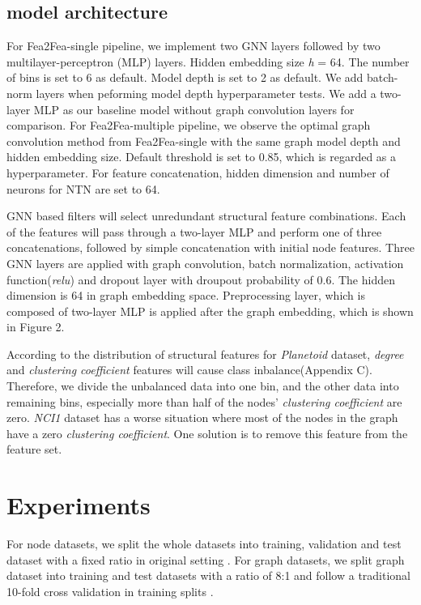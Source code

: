 \documentclass[runningheads]{llncs}
\newcommand{\xhdr}[1]{\vspace{1.7mm}\noindent{{\bf #1}}}
\begin{document}
\subsection{model architecture}
\vspace{-0.4cm}
\xhdr{Fea2Fea} For Fea2Fea-single pipeline, we implement two GNN layers followed by two multilayer-perceptron (MLP) layers. Hidden embedding size \textit{h} = 64. The number of bins  is set to 6 as default. Model depth  is set to 2 as default. We add batch-norm layers when peforming model depth hyperparameter tests. We add a two-layer MLP as our baseline model without graph convolution layers for comparison. For Fea2Fea-multiple pipeline, we observe the optimal graph convolution method from Fea2Fea-single with the same graph model depth and hidden embedding size. Default threshold  is set to 0.85, which is regarded as a hyperparameter. For feature concatenation, hidden dimension and number of neurons for NTN are set to 64. 

\xhdr{Application model} GNN based filters will select unredundant structural feature combinations. Each of the features will pass through a two-layer MLP and perform one of three concatenations, followed by simple concatenation with initial node features. Three GNN layers are applied with graph convolution, batch normalization, activation function(\textit{relu}) and dropout layer with droupout probability of 0.6. The hidden dimension is 64 in graph embedding space. Preprocessing layer, which is composed of two-layer MLP is applied after the graph embedding, which is shown in Figure 2.


\xhdr{Binning methods}
According to the distribution of structural features for \textit{Planetoid} dataset, \textit{degree} and \textit{clustering coefficient} features will cause class inbalance(Appendix C). Therefore, we divide the unbalanced data into one bin, and the other data 
into remaining bins, especially more than half of the nodes' \textit{clustering coefficient} are zero. \textit
{NCI1} dataset has a worse situation where most of the nodes in the graph have a zero 
\textit{clustering coefficient}. One solution is to remove this feature from
the feature set.
\vspace{-0.5cm}
\section{Experiments}
\vspace{-0.3cm}
For node datasets, we split the whole datasets into training, validation 
and test dataset with a fixed ratio in original setting \cite{hamilton2017inductive}. For graph datasets, we split graph 
dataset into training and test datasets with a ratio of 8:1 and follow a traditional 10-fold cross validation in training splits \cite{do2021twostage}.
\end{document}
